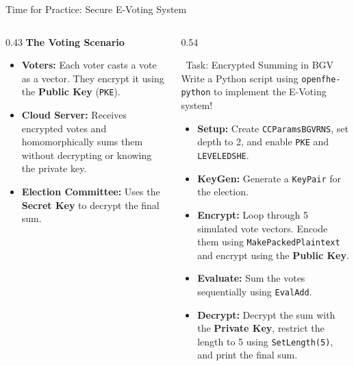 \documentclass[aspectratio=169, 10pt]{beamer}
\begin{document}
\begin{frame}{Time for Practice: Secure E-Voting System}
\begin{columns}[T]

\begin{column}{0.43\textwidth}
\vspace{0.1cm}
\textbf{\large The Voting Scenario} \\
\vspace{0.3cm}
\small
\begin{itemize}
    \item \textbf{Voters:} Each voter casts a vote as a vector. They encrypt it using the \textbf{Public Key} (\texttt{PKE}).
    \item \textbf{Cloud Server:} Receives encrypted votes and homomorphically sums them without decrypting or knowing the private key.
    \item \textbf{Election Committee:} Uses the \textbf{Secret Key} to decrypt the final sum.
\end{itemize}
\vspace{0.4cm}
\begin{center}
\textcolor{DeepBlue}{\LARGE \faUsers} \quad \textcolor{AccentOrange}{\LARGE \faArrowRight} \quad \textcolor{DeepBlue}{\LARGE \faCloud} \quad \textcolor{AccentOrange}{\LARGE \faArrowRight} \quad \textcolor{mygreen}{\LARGE \faUnlock}
\end{center}
\end{column}

\begin{column}{0.54\textwidth}
\begin{block}{\faKeyboard \ Task: Encrypted Summing in BGV}
\footnotesize
Write a Python script using \texttt{openfhe-python} to implement the E-Voting system!
\vspace{0.1cm}
\begin{itemize}
    \setlength{\itemsep}{0pt}
    \item \textbf{Setup:} Create \texttt{CCParamsBGVRNS}, set depth to 2, and enable \texttt{PKE} and \texttt{LEVELEDSHE}.
    \item \textbf{KeyGen:} Generate a \texttt{KeyPair} for the election.
    \item \textbf{Encrypt:} Loop through 5 simulated vote vectors. Encode them using \texttt{MakePackedPlaintext} and encrypt using the \textbf{Public Key}.
    \item \textbf{Evaluate:} Sum the votes sequentially using \texttt{EvalAdd}.
    \item \textbf{Decrypt:} Decrypt the sum with the \textbf{Private Key}, restrict the length to 5 using \texttt{SetLength(5)}, and print the final sum.
\end{itemize}
\end{block}
\end{column}

\end{columns}
\end{frame}
\end{document}
